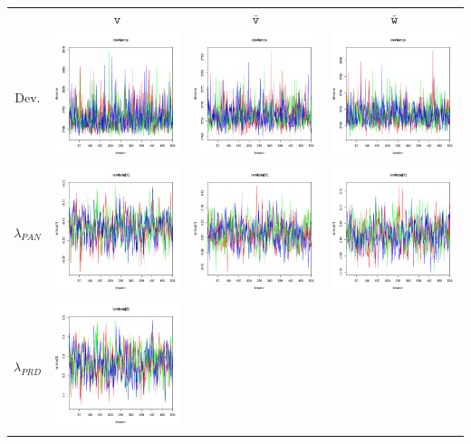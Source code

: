 \documentclass[letter,12pt]{article}
\begin{document}
\begin{table}
\centering
\begin{tabular}{cccc}
                     & $\texttt{v}$ & $\bar{\texttt{v}}$ & $\bar{\texttt{w}}$ \\ 
    Dev.             & \includegraphics[width=.15\columnwidth]{../graphs/traceplots/2015d0v_1.pdf} &
                        \includegraphics[width=.15\columnwidth]{../graphs/traceplots/2015d0vbar_1.pdf} &
                         \includegraphics[width=.15\columnwidth]{../graphs/traceplots/2015d0wbar_1.pdf} \\
    $\lambda_{PAN}$   & \includegraphics[width=.15\columnwidth]{../graphs/traceplots/2015d0v_2.pdf} &
                        \includegraphics[width=.15\columnwidth]{../graphs/traceplots/2015d0vbar_2.pdf} &
                         \includegraphics[width=.15\columnwidth]{../graphs/traceplots/2015d0wbar_2.pdf} \\
    $\lambda_{PRD}$   & \includegraphics[width=.15\columnwidth]{../graphs/traceplots/2015d0v_3.pdf} &

\end{tabular}
\end{table}
\end{document}
